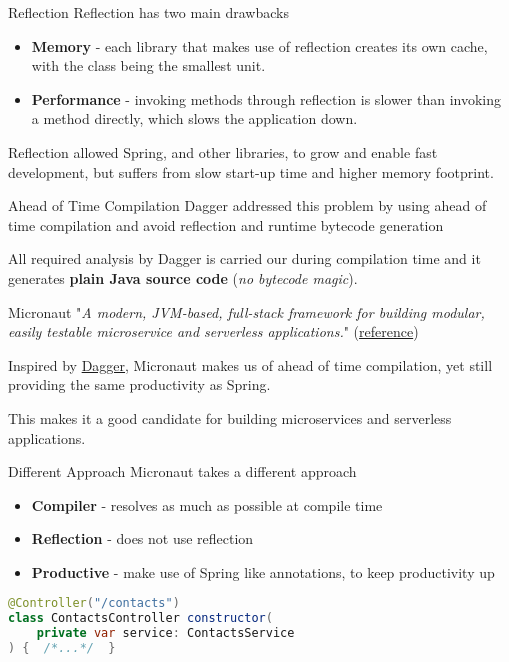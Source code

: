 \documentclass{beamer}
\begin{document}
  \begin{frame}[t]{Reflection}
    Reflection has two main drawbacks
    \begin{itemize}
      \item \textbf{Memory} - each library that makes use of reflection creates its own cache, with the class being the smallest unit.
      \item \textbf{Performance} - invoking methods through reflection is slower than invoking a method directly, which slows the application down.
    \end{itemize}

    \vspace{16pt}
    Reflection allowed Spring, and other libraries, to grow and enable fast development, but suffers from slow start-up time and higher memory footprint.
  \end{frame}


  \begin{frame}[t]{Ahead of Time Compilation}
    Dagger addressed this problem by using ahead of time compilation and avoid reflection and runtime bytecode generation

    All required analysis by Dagger is carried our during compilation time and it generates \textbf{plain Java source code} (\textit{no bytecode magic}).
  \end{frame}


  \begin{frame}[t]{Micronaut}
    "\textit{A modern, JVM-based, full-stack framework for building modular, easily testable microservice and serverless applications.}"  (\href{https://micronaut.io/}{reference})

    Inspired by \href{https://github.com/google/dagger}{Dagger}, Micronaut makes us of ahead of time compilation, yet still providing the same productivity as Spring.

    This makes it a good candidate for building microservices and serverless applications.
  \end{frame}


  \begin{frame}[t,fragile]{Different Approach}
    Micronaut takes a different approach
    
    \begin{itemize}
      \item \textbf{Compiler} - resolves as much as possible at compile time
      \item \textbf{Reflection} - does not use reflection
      \item \textbf{Productive} - make use of Spring like annotations, to keep productivity up
    \end{itemize}

    \vspace{16pt}
    \begin{lstlisting}[language=Java, backgroundcolor = \color{green!5}]
@Controller("/contacts")
class ContactsController constructor(
    private var service: ContactsService
) {  /*...*/  }
    \end{lstlisting}

  \end{frame}
\end{document}
